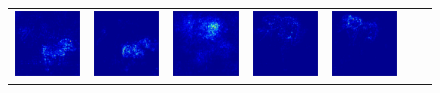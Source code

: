 \begin{figure}
\begin{center}
\begin{tabular}{ccccccc}
\includegraphics[width=0.14\linewidth,height=0.115\linewidth]{figs/examples/vggnet/soft/zeb-ele2_sali_341} &
\includegraphics[width=0.14\linewidth,height=0.115\linewidth]{figs/examples/googlenet/soft/zeb-ele2_sali_341} &
\includegraphics[width=0.14\linewidth,height=0.115\linewidth]{figs/examples/alexnet/soft/zeb-ele2_sali_387} &
\includegraphics[width=0.14\linewidth,height=0.115\linewidth]{figs/examples/vggnet/soft/zeb-ele2_sali_387} &
\includegraphics[width=0.14\linewidth,height=0.115\linewidth]{figs/examples/googlenet/soft/zeb-ele2_sali_387} \\

\end{tabular}
\end{center}
\end{figure}
